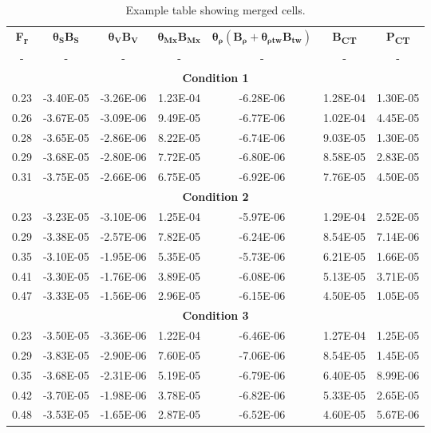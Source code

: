 \begin{table}[H] %
	\centering
	\caption{Example table showing merged cells.}
	\label{table_3}		
	\begin{tabular}{c|c|c|c|c|c|c}
		\toprule
		\textbf{F\textsubscript{r}} & $\boldsymbol{\theta_{S}B_{S}}$ & $\boldsymbol{\theta_{V}B_{V}}$ & $\boldsymbol{\theta_{Mx}B_{Mx}}$ & $\boldsymbol{\theta_{\rho}(B_{\rho}+\theta_{\rho tw}B_{tw})}$ & \textbf{B\textsubscript{CT}} & \textbf{P\textsubscript{CT}} \\
		\cmidrule(lr{.75em}){1-7}
		- & - & - & - & - & - & - \\
		\midrule
		\multicolumn{7}{c}{\textbf{Condition 1}} \\
		\midrule
		0.23  & -3.40E-05 & -3.26E-06 & 1.23E-04 & -6.28E-06 & 1.28E-04 & 1.30E-05 \\
		0.26  & -3.67E-05 & -3.09E-06 & 9.49E-05 & -6.77E-06 & 1.02E-04 & 4.45E-05 \\
		0.28  & -3.65E-05 & -2.86E-06 & 8.22E-05 & -6.74E-06 & 9.03E-05 & 1.30E-05 \\
		0.29  & -3.68E-05 & -2.80E-06 & 7.72E-05 & -6.80E-06 & 8.58E-05 & 2.83E-05 \\
		0.31  & -3.75E-05 & -2.66E-06 & 6.75E-05 & -6.92E-06 & 7.76E-05 & 4.50E-05 \\
		\midrule
		\multicolumn{7}{c}{\textbf{Condition 2}} \\
		\midrule
		0.23  & -3.23E-05 & -3.10E-06 & 1.25E-04 & -5.97E-06 & 1.29E-04 & 2.52E-05 \\
		0.29  & -3.38E-05 & -2.57E-06 & 7.82E-05 & -6.24E-06 & 8.54E-05 & 7.14E-06 \\
		0.35  & -3.10E-05 & -1.95E-06 & 5.35E-05 & -5.73E-06 & 6.21E-05 & 1.66E-05 \\
		0.41  & -3.30E-05 & -1.76E-06 & 3.89E-05 & -6.08E-06 & 5.13E-05 & 3.71E-05 \\
		0.47  & -3.33E-05 & -1.56E-06 & 2.96E-05 & -6.15E-06 & 4.50E-05 & 1.05E-05 \\
		\midrule
		\multicolumn{7}{c}{\textbf{Condition 3}} \\
		\midrule
		0.23  & -3.50E-05 & -3.36E-06 & 1.22E-04 & -6.46E-06 & 1.27E-04 & 1.25E-05 \\
		0.29  & -3.83E-05 & -2.90E-06 & 7.60E-05 & -7.06E-06 & 8.54E-05 & 1.45E-05 \\
		0.35  & -3.68E-05 & -2.31E-06 & 5.19E-05 & -6.79E-06 & 6.40E-05 & 8.99E-06 \\
		0.42  & -3.70E-05 & -1.98E-06 & 3.78E-05 & -6.82E-06 & 5.33E-05 & 2.65E-05 \\
		0.48  & -3.53E-05 & -1.65E-06 & 2.87E-05 & -6.52E-06 & 4.60E-05 & 5.67E-06 \\
		\bottomrule
	\end{tabular}
\end{table}
